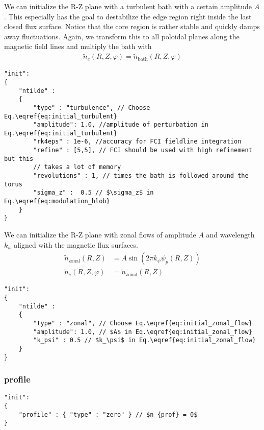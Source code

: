 We can initialize the R-Z plane with a turbulent bath with a certain amplitude $A$.
This especially has the goal to destabilize the edge region right inside the
last closed flux surface. Notice that the core region is rather stable
and quickly damps away fluctuations.
Again, we transform this to all poloidal planes along the magnetic field lines and multiply the bath with
\begin{align} \label{eq:initial_turbulent}
    \tilde n_e(R,Z,\varphi) = \tilde n_{\text{bath}}(R,Z,\varphi)
\end{align}
\begin{verbatim}
"init":
{
    "ntilde" :
    {
        "type" : "turbulence", // Choose Eq.\eqref{eq:initial_turbulent}
        "amplitude": 1.0, //amplitude of perturbation in Eq.\eqref{eq:initial_turbulent}
        "rk4eps" : 1e-6, //accuracy for FCI fieldline integration
        "refine" : [5,5], // FCI should be used with high refinement but this
        // takes a lot of memory
        "revolutions" : 1, // times the bath is followed around the torus
        "sigma_z" :  0.5 // $\sigma_z$ in Eq.\eqref{eq:modulation_blob}
    }
}
\end{verbatim}
We can initialize the R-Z plane with zonal flows of amplitude $A$ and
wavelength $k_\psi$ aligned with the magnetic flux surfaces.
\begin{align} \label{eq:initial_zonal_flow}
    \tilde n_{\text{zonal}}(R,Z) &= A \sin (2\pi k_\psi \psi_p(R,Z)) \nonumber\\
\tilde n_e(R,Z,\varphi) &= \tilde n_{\text{zonal}}(R,Z)
\end{align}
\begin{verbatim}
"init":
{
    "ntilde" :
    {
        "type" : "zonal", // Choose Eq.\eqref{eq:initial_zonal_flow}
        "amplitude": 1.0, // $A$ in Eq.\eqref{eq:initial_zonal_flow}
        "k_psi" : 0.5 // $k_\psi$ in Eq.\eqref{eq:initial_zonal_flow}
    }
}
\end{verbatim}
\subsubsection{profile} \label{sec:profile}
\begin{verbatim}
"init":
{
    "profile" : { "type" : "zero" } // $n_{prof} = 0$
}
\end{verbatim}

